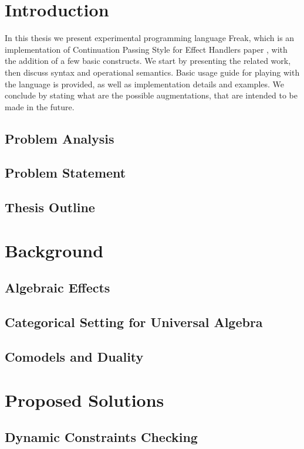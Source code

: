 \documentclass[declaration,shortabstract]{iithesis}
\author         {Mateusz Urbańczyk}
\date           {30 czerwca 2020}                     %
\begin{document}

\chapter{Introduction}

In this thesis we present experimental programming language Freak, which is an
implementation of Continuation Passing Style for Effect Handlers paper \cite{handlers-cps},
with the addition of a few basic constructs. We start by presenting the related work,
then discuss syntax and operational semantics. Basic usage guide for playing with
the language is provided, as well as implementation details and examples. We conclude
by stating what are the possible augmentations, that are intended to be made in the future.

\section{Problem Analysis}
\section{Problem Statement}
\section{Thesis Outline}

\chapter{Background}
\section{Algebraic Effects}
\section{Categorical Setting for Universal Algebra}
\section{Comodels and Duality}

\chapter{Proposed Solutions}
\section{Dynamic Constraints Checking}
\end{document}
